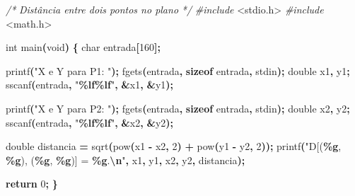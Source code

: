 \documentclass[
  11pt,
  a4paper,
]{scrbook}
\newenvironment{Shaded}{\begin{snugshade}}{\end{snugshade}}
\newcommand{\CommentTok}[1]{\textcolor[rgb]{0.56,0.35,0.01}{\textit{#1}}}
\newcommand{\ControlFlowTok}[1]{\textcolor[rgb]{0.13,0.29,0.53}{\textbf{#1}}}
\newcommand{\DataTypeTok}[1]{\textcolor[rgb]{0.13,0.29,0.53}{#1}}
\newcommand{\DecValTok}[1]{\textcolor[rgb]{0.00,0.00,0.81}{#1}}
\newcommand{\ImportTok}[1]{#1}
\newcommand{\KeywordTok}[1]{\textcolor[rgb]{0.13,0.29,0.53}{\textbf{#1}}}
\newcommand{\NormalTok}[1]{#1}
\newcommand{\OperatorTok}[1]{\textcolor[rgb]{0.81,0.36,0.00}{\textbf{#1}}}
\newcommand{\PreprocessorTok}[1]{\textcolor[rgb]{0.56,0.35,0.01}{\textit{#1}}}
\newcommand{\SpecialCharTok}[1]{\textcolor[rgb]{0.81,0.36,0.00}{\textbf{#1}}}
\newcommand{\StringTok}[1]{\textcolor[rgb]{0.31,0.60,0.02}{#1}}
\begin{document}
\begin{Shaded}
\begin{Highlighting}[]
\CommentTok{/* }
\CommentTok{Distância entre dois pontos no plano}
\CommentTok{*/}
\PreprocessorTok{\#include }\ImportTok{\textless{}stdio.h\textgreater{}}
\PreprocessorTok{\#include }\ImportTok{\textless{}math.h\textgreater{}}

\DataTypeTok{int}\NormalTok{ main}\OperatorTok{(}\DataTypeTok{void}\OperatorTok{)} \OperatorTok{\{}
    \DataTypeTok{char}\NormalTok{ entrada}\OperatorTok{[}\DecValTok{160}\OperatorTok{];}

\NormalTok{    printf}\OperatorTok{(}\StringTok{"X e Y para P1: "}\OperatorTok{);}
\NormalTok{    fgets}\OperatorTok{(}\NormalTok{entrada}\OperatorTok{,} \KeywordTok{sizeof}\NormalTok{ entrada}\OperatorTok{,}\NormalTok{ stdin}\OperatorTok{);}
    \DataTypeTok{double}\NormalTok{ x1}\OperatorTok{,}\NormalTok{ y1}\OperatorTok{;}
\NormalTok{    sscanf}\OperatorTok{(}\NormalTok{entrada}\OperatorTok{,} \StringTok{"}\SpecialCharTok{\%lf\%lf}\StringTok{"}\OperatorTok{,} \OperatorTok{\&}\NormalTok{x1}\OperatorTok{,} \OperatorTok{\&}\NormalTok{y1}\OperatorTok{);}
    
\NormalTok{    printf}\OperatorTok{(}\StringTok{"X e Y para P2: "}\OperatorTok{);}
\NormalTok{    fgets}\OperatorTok{(}\NormalTok{entrada}\OperatorTok{,} \KeywordTok{sizeof}\NormalTok{ entrada}\OperatorTok{,}\NormalTok{ stdin}\OperatorTok{);}
    \DataTypeTok{double}\NormalTok{ x2}\OperatorTok{,}\NormalTok{ y2}\OperatorTok{;}
\NormalTok{    sscanf}\OperatorTok{(}\NormalTok{entrada}\OperatorTok{,} \StringTok{"}\SpecialCharTok{\%lf\%lf}\StringTok{"}\OperatorTok{,} \OperatorTok{\&}\NormalTok{x2}\OperatorTok{,} \OperatorTok{\&}\NormalTok{y2}\OperatorTok{);}
    
    \DataTypeTok{double}\NormalTok{ distancia }\OperatorTok{=}\NormalTok{ sqrt}\OperatorTok{(}\NormalTok{pow}\OperatorTok{(}\NormalTok{x1 }\OperatorTok{{-}}\NormalTok{ x2}\OperatorTok{,} \DecValTok{2}\OperatorTok{)} \OperatorTok{+}\NormalTok{ pow}\OperatorTok{(}\NormalTok{y1 }\OperatorTok{{-}}\NormalTok{ y2}\OperatorTok{,} \DecValTok{2}\OperatorTok{));}
\NormalTok{    printf}\OperatorTok{(}\StringTok{"D[(}\SpecialCharTok{\%g}\StringTok{, }\SpecialCharTok{\%g}\StringTok{), (}\SpecialCharTok{\%g}\StringTok{, }\SpecialCharTok{\%g}\StringTok{)] = }\SpecialCharTok{\%g}\StringTok{.}\SpecialCharTok{\textbackslash{}n}\StringTok{"}\OperatorTok{,}\NormalTok{ x1}\OperatorTok{,}\NormalTok{ y1}\OperatorTok{,}\NormalTok{ x2}\OperatorTok{,}\NormalTok{ y2}\OperatorTok{,}\NormalTok{ distancia}\OperatorTok{);}

    \ControlFlowTok{return} \DecValTok{0}\OperatorTok{;}
\OperatorTok{\}}
\end{Highlighting}
\end{Shaded}
\end{document}
